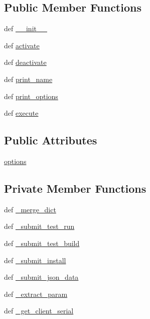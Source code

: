 \subsection*{Public Member Functions}
\begin{DoxyCompactItemize}
\item 
def \hyperlink{classIUDatabase_1_1IUDatabase_aa12deecc4a4575f2f203e2bd1b8f0d59}{\-\_\-\-\_\-init\-\_\-\-\_\-}
\item 
def \hyperlink{classIUDatabase_1_1IUDatabase_ab53b555dbca9e121b4e5547f7ec2ecf5}{activate}
\item 
def \hyperlink{classIUDatabase_1_1IUDatabase_a57697e286ce6859233fbf07df5366b30}{deactivate}
\item 
def \hyperlink{classIUDatabase_1_1IUDatabase_a1c5472e3c083eda003ce17d0d40acbe3}{print\-\_\-name}
\item 
def \hyperlink{classIUDatabase_1_1IUDatabase_ac5175b773da96c0c792a262ad444c09c}{print\-\_\-options}
\item 
def \hyperlink{classIUDatabase_1_1IUDatabase_ab26ffba77df100f5b442fafa12e758ec}{execute}
\end{DoxyCompactItemize}
\subsection*{Public Attributes}
\begin{DoxyCompactItemize}
\item 
\hyperlink{classIUDatabase_1_1IUDatabase_a87c602469e1908c2c79859691839e9de}{options}
\end{DoxyCompactItemize}
\subsection*{Private Member Functions}
\begin{DoxyCompactItemize}
\item 
def \hyperlink{classIUDatabase_1_1IUDatabase_a98afecb796bd619142a3c440e9926d41}{\-\_\-merge\-\_\-dict}
\item 
def \hyperlink{classIUDatabase_1_1IUDatabase_a014e879e7f4eff72175443a886a8944f}{\-\_\-submit\-\_\-test\-\_\-run}
\item 
def \hyperlink{classIUDatabase_1_1IUDatabase_abfad8bfb6698d723b5cc99d303744c55}{\-\_\-submit\-\_\-test\-\_\-build}
\item 
def \hyperlink{classIUDatabase_1_1IUDatabase_a75e930a15c9ee4e1b7fa5dd4d5c4cfe9}{\-\_\-submit\-\_\-install}
\item 
def \hyperlink{classIUDatabase_1_1IUDatabase_abf478525045264145f74b84ff58adffc}{\-\_\-submit\-\_\-json\-\_\-data}
\item 
def \hyperlink{classIUDatabase_1_1IUDatabase_ad171afe463a3d8f70c2dc8ff92736bf0}{\-\_\-extract\-\_\-param}
\item 
def \hyperlink{classIUDatabase_1_1IUDatabase_a247089fa0f6a81a05e5a893de6503738}{\-\_\-get\-\_\-client\-\_\-serial}
\end{DoxyCompactItemize}


